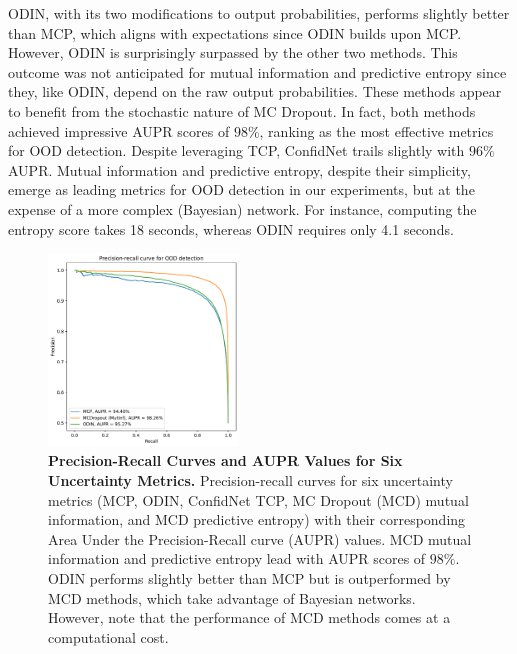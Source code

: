 ODIN, with its two modifications to output probabilities, performs slightly better than MCP, which aligns with expectations since ODIN builds upon MCP. However, ODIN is surprisingly surpassed by the other two methods. This outcome was not anticipated for mutual information and predictive entropy since they, like ODIN, depend on the raw output probabilities. These methods appear to benefit from the stochastic nature of MC Dropout. In fact, both methods achieved impressive AUPR scores of $98\%$, ranking as the most effective metrics for OOD detection. Despite leveraging TCP, ConfidNet trails slightly with $96\%$ AUPR. Mutual information and predictive entropy, despite their simplicity, emerge as leading metrics for OOD detection in our experiments, but at the expense of a more complex (Bayesian) network. For instance, computing the entropy score takes 18 seconds, whereas ODIN requires only 4.1 seconds.
\begin{figure}[H]
    \centering
    \includegraphics[width=0.45\textwidth]{OOD_aupr.pdf}
    \caption{\textbf{Precision-Recall Curves and AUPR Values for Six Uncertainty Metrics.} Precision-recall curves for six uncertainty metrics (MCP, ODIN, ConfidNet TCP, MC Dropout (MCD) mutual information, and MCD predictive entropy) with their corresponding Area Under the Precision-Recall curve (AUPR) values. MCD mutual information and predictive entropy lead with AUPR scores of $98\%$. ODIN performs slightly better than MCP but is outperformed by MCD methods, which take advantage of Bayesian networks. However, note that the performance of MCD methods comes at a computational cost.}
    \label{fig:OOD_aupr}
\end{figure}

